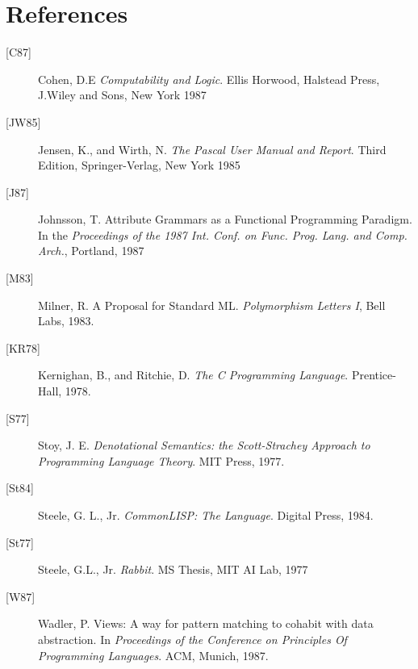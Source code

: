\begin{sloppypar}
\section*{References}

\begin{description}
\item[\mbox{[C87]}]
        Cohen, D.E {\em Computability and Logic}. Ellis Horwood,
Halstead Press, J.Wiley and Sons, New York 1987
\item[\mbox{[JW85]}]
        Jensen, K., and Wirth, N. {\em The Pascal User Manual and
Report}. Third Edition, Springer-Verlag, New York 1985
\item[\mbox{[J87]}]
	Johnsson, T. Attribute Grammars as a Functional Programming
Paradigm. In the {\em Proceedings of the 1987 Int. Conf. on Func. Prog.
Lang. and Comp. Arch.}, Portland, 1987
\item[\mbox{[M83]}]
        Milner, R. A Proposal for Standard ML. {\em Polymorphism Letters I},
Bell Labs, 1983.
\item[\mbox{[KR78]}]
        Kernighan, B., and Ritchie, D. {\em The C Programming
Language}. Prentice-Hall, 1978.
\item[\mbox{[S77]}]
        Stoy, J. E. {\em Denotational Semantics: the Scott-Strachey
Approach to Programming Language Theory}. MIT Press, 1977.
\item[\mbox{[St84]}]
        Steele, G. L., Jr. {\em CommonLISP: The Language}. Digital Press, 1984.
\item[\mbox{[St77]}]
        Steele, G.L., Jr. {\em Rabbit}. MS Thesis, MIT AI Lab, 1977
\item[\mbox{[W87]}]
        Wadler, P. Views: A way for pattern matching to cohabit with
data abstraction. In {\em Proceedings of the Conference on Principles
Of Programming Languages}. ACM, Munich, 1987.
\end{description}

\end{sloppypar}


